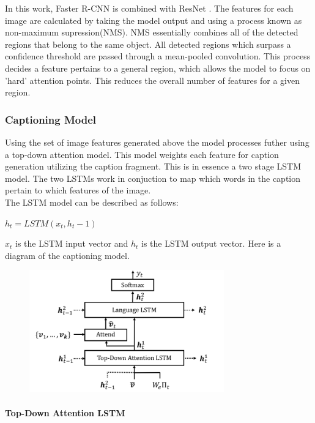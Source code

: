 \documentclass[a4paper]{article}
\begin{document}
\noindent In this work, Faster R-CNN is combined with ResNet \cite{DBLP:journals/corr/HeZRS15}. The features for each image are calculated by taking the model output and using a process known as non-maximum supression(NMS). NMS essentially combines all of the detected regions that belong to the same object. All detected regions which surpass a confidence threshold are passed through a mean-pooled convolution. This process decides a feature pertains to a general region, which allows the model to focus on 'hard' attention points. This reduces the overall number of features for a given region.
\\

\subsubsection{Captioning Model}

Using the set of image features generated above the model processes futher using a top-down attention model. This model weights each feature for caption generation utilizing the caption fragment. This is in essence a two stage LSTM model. The two LSTMs work in conjuction to map which words in the caption pertain to which features of the image. 
\\
The LSTM model can be described as follows:
\\
\begin{center}
$h_t = LSTM(x_t, h_t−1)$
\end{center}
$x_t$ is the LSTM input vector and $h_t$ is the LSTM
output vector. Here is a diagram of the captioning model.
\begin{figure}[H]
\centering
\includegraphics[width=0.75\textwidth]{topdown.png}
\end{figure}
\paragraph{Top-Down Attention LSTM}
\end{document}
